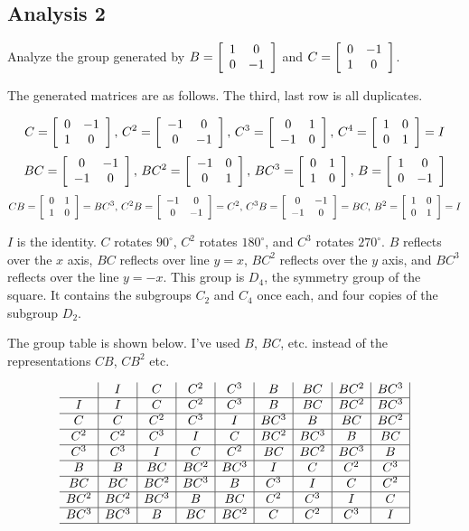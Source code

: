 \documentclass[../gatm.tex]{subfiles}
\begin{document}
\subsection*{Analysis 2}

Analyze the group generated by $B=\left[\begin{array}{cc} 1 & 0 \\ 0 & -1 \end{array}\right]$ and $C=\left[\begin{array}{cc} 0 & -1 \\ 1 & 0 \end{array}\right]$.

The generated matrices are as follows. The third, last row is all duplicates.

$$C=\left[\begin{array}{cc} 0 & -1 \\ 1 & 0 \end{array}\right],\, C^2=\left[\begin{array}{cc} -1 & 0 \\ 0 & -1 \end{array}\right],\, C^3=\left[\begin{array}{cc} 0 & 1 \\ -1 & 0 \end{array}\right],\, C^4=\left[\begin{array}{cc} 1 & 0 \\ 0 & 1 \end{array}\right]=I$$
$$BC=\left[\begin{array}{cc} 0 & -1 \\ -1 & 0 \end{array}\right],\, BC^2=\left[\begin{array}{cc} -1 & 0 \\ 0 & 1 \end{array}\right],\, BC^3 = \left[\begin{array}{cc} 0 & 1 \\ 1 & 0 \end{array}\right],\, B = \left[\begin{array}{cc} 1 & 0 \\ 0 & -1 \end{array}\right]$$
$$CB=\left[\begin{array}{cc} 0 & 1 \\ 1 & 0 \end{array}\right]=BC^3,\, C^2B=\left[\begin{array}{cc} -1 & 0 \\ 0 & -1 \end{array}\right]=C^2,\, C^3B=\left[\begin{array}{cc} 0 & -1 \\ -1 & 0 \end{array}\right]=BC,\, B^2=\left[\begin{array}{cc} 1 & 0 \\ 0 & 1 \end{array}\right]=I$$

$I$ is the identity. $C$ rotates $90^\circ$, $C^2$ rotates $180^\circ$, and $C^3$ rotates $270^\circ$. $B$ reflects over the $x$ axis, $BC$ reflects over line $y=x$, $BC^2$ reflects over the $y$ axis, and $BC^3$ reflects over the line $y=-x$. This group is $D_4$, the symmetry group of the square. It contains the subgroups $C_2$ and $C_4$ once each, and four copies of the subgroup $D_2$.

The group table is shown below. I've used $B$, $BC$, etc. instead of the representations $CB$, $CB^2$ etc.

$$\begin{array}{c|c|c|c|c|c|c|c|c|}
& I & C & C^2 & C^3 & B & BC & BC^2 & BC^3 \\ \hline
I & I & C & C^2 & C^3 & B & BC & BC^2 & BC^3 \\ \hline
C & C & C^2 & C^3 & I & BC^3 & B & BC & BC^2 \\ \hline
C^2 & C^2 & C^3 & I & C & BC^2 & BC^3 & B & BC \\ \hline
C^3 & C^3 & I & C & C^2 & BC & BC^2 & BC^3 & B \\ \hline
B & B & BC & BC^2 & BC^3 & I & C & C^2 & C^3 \\ \hline
BC & BC & BC^2 & BC^3 & B & C^3 & I & C & C^2 \\ \hline
BC^2 & BC^2 & BC^3 & B & BC & C^2 & C^3 & I & C \\ \hline
BC^3 & BC^3 & B & BC & BC^2 & C & C^2 & C^3 & I \\ \hline
\end{array}$$
\end{document}
